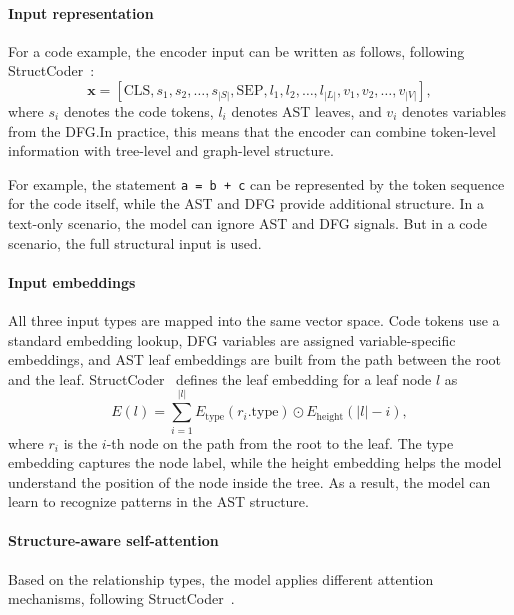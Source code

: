 \documentclass[12pt]{article}
\begin{document}
\paragraph{Input representation}
For a code example, the encoder input can be written as follows, following StructCoder~\cite{10.1145/3636430}:
\begin{equation}
\mathbf{x} = [\mathrm{CLS}, s_1, s_2, \ldots, s_{|S|}, \mathrm{SEP}, l_1, l_2, \ldots, l_{|L|}, v_1, v_2, \ldots, v_{|V|}],
\end{equation}
where $s_i$ denotes the code tokens, $l_i$ denotes AST leaves, and $v_i$ denotes variables from the DFG.\@ In practice, this means that the encoder can combine token-level information with tree-level and graph-level structure.

For example, the statement \texttt{a = b + c} can be represented by the token sequence for the code itself, while the AST and DFG provide additional structure. In a text-only scenario, the model can ignore AST and DFG signals. But in a code scenario, the full structural input is used.

\paragraph{Input embeddings}
All three input types are mapped into the same vector space. Code tokens use a standard embedding lookup, DFG variables are assigned variable-specific embeddings, and AST leaf embeddings are built from the path between the root and the leaf. StructCoder~\cite{10.1145/3636430} defines the leaf embedding for a leaf node $l$ as
\begin{equation}
E(l) = \sum_{i=1}^{|l|} E_{\mathrm{type}}(r_i.\mathrm{type}) \odot E_{\mathrm{height}}(|l|-i),
\end{equation}
where $r_i$ is the $i$-th node on the path from the root to the leaf. The type embedding captures the node label, while the height embedding helps the model understand the position of the node inside the tree. As a result, the model can learn to recognize patterns in the AST structure.

\paragraph{Structure-aware self-attention}
Based on the relationship types, the model applies different attention mechanisms, following StructCoder~\cite{10.1145/3636430}.
\end{document}

